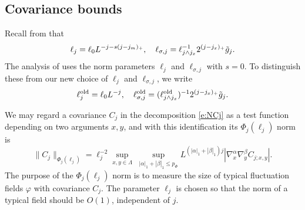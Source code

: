 
\subsection{Covariance bounds}
\label{sec:Cbds}

Recall from  that
\begin{equation}
\label{e:elldef}
\ell_j
	=
\ell_0 L^{-j - s (j - j_m)_+}, \quad
\ell_{\sigma,j}
	=
\ell_{j \wedge j_{x}}^{-1} 2^{(j - j_{x})_+} \tilde{g}_j.
\end{equation}
The analysis of \cite{BS-rg-IE,BS-rg-step} uses the norm parameters $\ell_j$ and $\ell_{\sigma,j}$ with $s = 0$.
To distinguish these from our
new choice  of $\ell_j$ and $\ell_{\sigma,j}$, we write
\begin{equation}
\label{e:ell-old}
    \ell_j^{\mathrm{old}} = \ell_0 L^{-j},
    \quad
    \ell_{\sigma,j}^{\mathrm{old}}  =
    (\ell_{j \wedge j_{x}}^{\rm old})^{-1}2^{(j - j_{x})_+}\tilde{g}_j.
\end{equation}

We may regard a covariance $C_j$ in the decomposition \eqref{e:NCj}
as a test function depending on
two arguments $x,y$, and with this identification its $\Phi_j(\ell_j)$
norm is
\begin{equation}
    \label{e:Phinorm}
    \|C_j\|_{\Phi_{j}(\ell_j)}  =
    \ell_j^{-2}
    \sup_{x,y\in \Lambda}
    \;
    \sup_{|\alpha|_1 + |\beta|_1 \le p_\Phi}
    L^{(|\alpha|_1+  |\beta|_1)j}
    |\nabla_x^{\alpha} \nabla_y^{\beta} C_{j;x,y}|.
\end{equation}
The purpose of the $\Phi_j(\ell_j)$ norm is to measure the size of typical
fluctuation fields $\varphi$ with covariance $C_j$.
The parameter $\ell_j$ is chosen so that the norm of a typical field should
be $O(1)$, independent of $j$.

